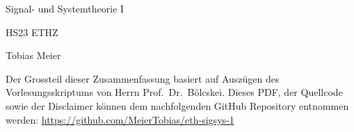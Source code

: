 \documentclass[a4paper,10pt,landscape]{article}
\begin{document}
\begin{multicols*}{3}

    \begin{center}
        \huge{Signal- und Systemtheorie I \par}
        \vspace{0.1cm}
        \large{HS23 ETHZ\par}
        \vspace{0.3cm}
        \normalsize{Tobias Meier}
        \vspace{0.3cm}
    \end{center}
    {
    Der Grossteil dieser Zusammenfassung basiert auf Auszügen des Vorlesungsskriptums von Herrn Prof.\ Dr.\ Bölcskei.\newline{}
    Dieses PDF, der Quellcode sowie der Disclaimer können dem nachfolgenden GitHub Repository entnommen werden: \url{https://github.com/MeierTobias/eth-sigsys-1}
    }
    \vspace{0.2cm}

    

    

    

    

    

    

    

    

    

    

    

    


\end{multicols*}
\end{document}
